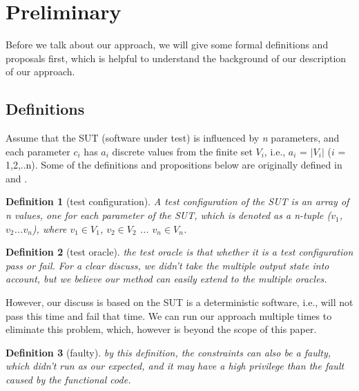 \documentclass[10pt,journal,cspaper,compsoc]{IEEEtran}
\begin{document}
\section{Preliminary} \label{sec:back}
Before we talk about our approach, we will give some formal definitions and proposals first, which is helpful to understand the background of our description of our approach.

\subsection{Definitions}\label{sec:back:define}
Assume that the SUT (software under test) is influenced by \emph{n} parameters, and each parameter $c_{i}$ has $a_{i}$ discrete values from the finite set $V_{i}$, i.e., $a_{i}$ = $|V_{i}|$ ($i$ = 1,2,..n). Some of the definitions and propositions below are originally defined in and .

\newtheorem{definition}{Definition}
\begin{definition}[test configuration]
A test configuration of the SUT is an array of \emph{n} values, one for each parameter of the SUT, which is denoted as a \emph{n}-tuple ($v_{1}$, $v_{2}$...$v_{n}$), where $v_{1}\in V_{1}$, $v_{2} \in V_{2}$ ... $v_{n} \in V_{n}$.
\end{definition}
\begin{definition}[test oracle]
the test oracle is that whether it is a test configuration pass or fail. For a clear discuss, we didn't take the multiple output state into account, but we believe our method can easily extend to the multiple oracles.
\end{definition}

However, our discuss is based on the SUT is a deterministic software, i.e., will not pass this time and fail that time. We can run our approach multiple times to eliminate this problem, which, however is beyond the scope of this paper.


\begin{definition}[faulty]

by this definition, the constraints can also be a faulty, which didn't run as our expected, and it may have a high privilege than the fault caused by the functional code.

\end{definition}
\end{document}

